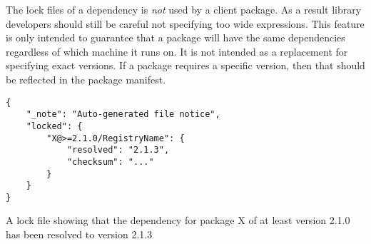 The lock files of a dependency is \emph{not} used by a client package. As a
result library developers should still be careful not specifying too wide
expressions. This feature is only intended to guarantee that a package will
have the same dependencies regardless of which machine it runs on. It is not
intended as a replacement for specifying exact versions. If a package requires
a specific version, then that should be reflected in the package manifest.

\begin{listing}[H]
\begin{verbatim}
{
    "_note": "Auto-generated file notice",
    "locked": {
        "X@>=2.1.0/RegistryName": {
            "resolved": "2.1.3",
            "checksum": "..."
        }
    }
}
\end{verbatim}

\caption{A lock file showing that the dependency for package X of at least
    version 2.1.0 has been resolved to version 2.1.3}

\label{lst:lock_file}
\end{listing}
